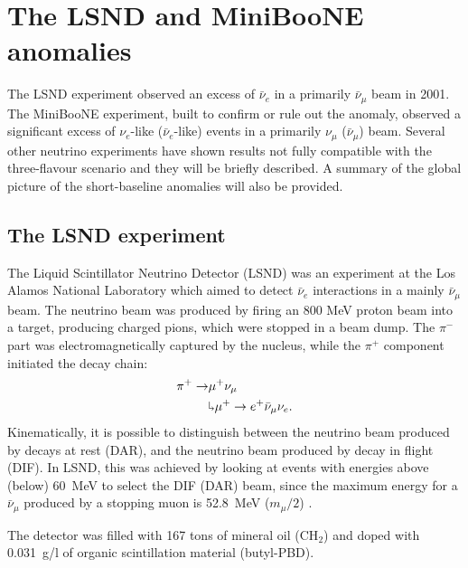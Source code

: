 \chapter{\label{ch:3-anomalies}The LSND and MiniBooNE anomalies}

\minitoc

The LSND experiment observed an excess of $\bar{\nu}_{e}$ in a primarily $\bar{\nu}_{\mu}$ beam in 2001. The MiniBooNE experiment, built to confirm or rule out the anomaly, observed a significant excess of $\nu_{e}$-like ($\bar{\nu}_{e}$-like) events in a primarily $\nu_{\mu}$ ($\bar{\nu}_{\mu}$) beam. Several other neutrino experiments have shown results not fully compatible with the three-flavour scenario and they will be briefly described.  A summary of the global picture of the short-baseline anomalies will also be provided.

\section{The LSND experiment}
The Liquid Scintillator Neutrino Detector (LSND) was an experiment at the Los Alamos National Laboratory which aimed to detect $\bar{\nu}_e$ interactions in a mainly $\bar{\nu}_{\mu}$ beam. The neutrino beam was produced by firing an 800 MeV proton beam into a target, producing charged pions, which were stopped in a beam dump. The $\pi^-$ part was electromagnetically captured by the nucleus, while the $\pi^+$ component initiated the decay chain:
\begin{align}
    \pi^+ \rightarrow & \mu^+\nu_{\mu}\\
    & \rotatebox[origin=c]{180}{$\Lsh$}	 \mu^{+} \rightarrow e^+\bar{\nu}_{\mu}\nu_{e}.
\end{align}
Kinematically, it is possible to distinguish between the neutrino beam produced by decays at rest (DAR), and the neutrino beam produced by decay in flight (DIF). In LSND, this was achieved by looking at events with energies above (below) 60~MeV to select the DIF (DAR) beam, since the maximum energy for a $\bar{\nu}_{\mu}$ produced by a stopping muon is 52.8~MeV ($m_{\mu}/2$) .

The detector was filled with 167 tons of mineral oil (CH$_2$) and doped with 0.031~g/l of organic scintillation material (butyl-PBD).

